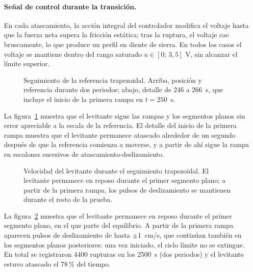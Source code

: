 \paragraph{Señal de control durante la transición.}
En cada atascamiento, la acción integral del controlador modifica el voltaje hasta que la fuerza neta supera la fricción estática; tras la ruptura, el voltaje cae bruscamente, lo que produce un perfil en diente de sierra.
En todos los casos el voltaje se mantiene dentro del rango saturado $u \in [0;\,3{,}5]$ V,
sin alcanzar el límite superior.

\begin{figure}[ht]
    \centering
    
    \caption[Seguimiento trapezoidal: posición]{Seguimiento de la referencia trapezoidal. Arriba, posición y referencia durante dos periodos; abajo, detalle de 246 a 266~s, que incluye el inicio de la primera rampa en $t=250$~s.}
    \label{fig:trap_pos}
\end{figure}

La figura~\ref{fig:trap_pos} muestra que el levitante sigue las rampas y los segmentos planos sin error apreciable a la escala de la referencia. El detalle del inicio de la primera rampa muestra que el levitante permanece atascado alrededor de un segundo después de que la referencia comienza a moverse, y a partir de ahí sigue la rampa en escalones sucesivos de atascamiento-deslizamiento.

\FloatBarrier

\begin{figure}[ht]
    \centering
    
    \caption[Seguimiento trapezoidal: velocidad]{Velocidad del levitante durante el seguimiento trapezoidal. El levitante permanece en reposo durante el primer segmento plano; a partir de la primera rampa, los pulsos de deslizamiento se mantienen durante el resto de la prueba.}
    \label{fig:trap_vel}
\end{figure}

La figura~\ref{fig:trap_vel} muestra que el levitante permanece en reposo durante el primer segmento plano, en el que parte del equilibrio. A partir de la primera rampa aparecen pulsos de deslizamiento de hasta $\pm 1$~cm/s, que continúan también en los segmentos planos posteriores: una vez iniciado, el ciclo límite no se extingue. En total se registraron 4400 rupturas en los 2500~s (dos periodos) y el levitante estuvo atascado el 78\,\% del tiempo.

\FloatBarrier

